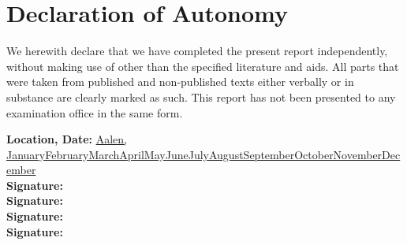 \section*{Declaration of Autonomy}
We herewith declare that we have completed the present report independently, without making use of other than the specified literature and aids. All parts that were taken from published and non-published texts either verbally or in substance are clearly marked as such. This report has not been presented to any examination office in the same form.
\begin{flushleft}
	  \textbf{Location, Date:} \underline{Aalen, \number\day\space\ifcase\month\or January\or February\or March\or April\or May\or June\or July\or August\or September\or October\or November\or December\fi\space\number\year \hspace{5cm}} \\
    \vspace{1cm}
    \textbf{Signature:} \underline{\hspace{5cm}}\\
   	\vspace{1cm}
    \textbf{Signature:} \underline{\hspace{5cm}}\\
    \vspace{1cm}
    \textbf{Signature:} \underline{\hspace{5cm}}\\
    \vspace{1cm}
    \textbf{Signature:} \underline{\hspace{5cm}}
\end{flushleft}

